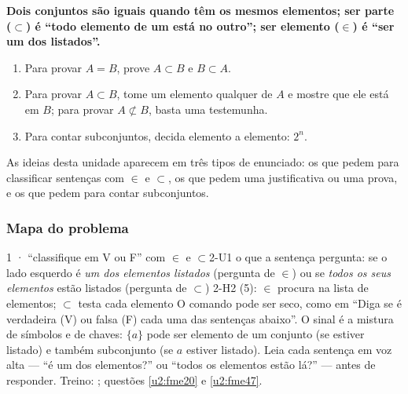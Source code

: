 \begin{paralembrar}\label{lembrar-u2}
\textbf{Dois conjuntos são iguais quando têm os mesmos elementos; ser parte ($\subset$) é \enquote{todo elemento de um está no outro}; ser elemento ($\in$) é \enquote{ser um dos listados}.}
\begin{enumerate}[label=\arabic*.,leftmargin=1.4em,itemsep=1pt]
  \item Para provar $A=B$, prove $A\subset B$ e $B\subset A$.
  \item Para provar $A\subset B$, tome um elemento qualquer de $A$ e mostre que ele está em $B$; para provar $A\not\subset B$, basta uma testemunha.
  \item Para contar subconjuntos, decida elemento a elemento: $2^n$.
\end{enumerate}
\end{paralembrar}

\OndeEUsado

As ideias desta unidade aparecem em três tipos de enunciado: os que pedem para classificar sentenças com $\in$ e $\subset$, os que pedem uma justificativa ou uma prova, e os que pedem para contar subconjuntos.

\subsubsection{Mapa do problema}

\begin{caso}{1 · \enquote{classifique em V ou F} com $\in$ e $\subset$}{2-U1}
{o que a sentença pergunta: se o lado esquerdo é \emph{um dos elementos listados} (pergunta de $\in$) ou se \emph{todos os seus elementos} estão listados (pergunta de $\subset$)}
{2-H2 (5): $\in$ procura na lista de elementos; $\subset$ testa cada elemento}
\reconhecer O comando pode ser seco, como em \enquote{Diga se é verdadeira (V) ou falsa (F) cada uma das sentenças abaixo}. O sinal é a mistura de símbolos e de chaves: $\{a\}$ pode ser elemento de um conjunto (se estiver listado) e também subconjunto (se $a$ estiver listado). Leia cada sentença em voz alta — \enquote{é um dos elementos?} ou \enquote{todos os elementos estão lá?} — antes de responder. Treino: ; questões \ref{u2:fme20} e \ref{u2:fme47}.
\end{caso}

